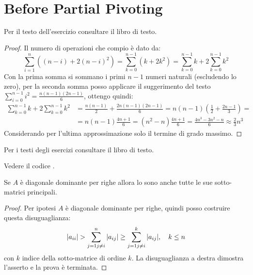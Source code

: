 \section{Before Partial Pivoting}

\begin{exercise}[3.6]
Per il testo dell'esercizio consultare il libro di testo.
\end{exercise}
\begin{proof}
Il numero di operazioni che compio \`e dato da:
\begin{displaymath}
\sum_{i = 1}^{n}{\left( (n-i) + 2(n-i)^{2} \right)} =
\sum_{k = 0}^{n - 1}{\left( k + 2k^{2} \right)} = 
\sum_{k = 0}^{n - 1}{k } + 2\sum_{k = 0}^{n - 1}{k^{2}} 
\end{displaymath}
Con la prima somma si sommano i primi $n-1$ numeri naturali (escludendo lo
zero), per la seconda somma posso applicare il suggerimento del testo 
$\sum_{i = 0}^{n-1}{i^{2}} = \frac{n(n-1)(2n-1)}{6}$, ottengo quindi:
\begin{displaymath}
\begin{split}
\sum_{k = 0}^{n - 1}{k } + 2\sum_{k = 0}^{n - 1}{k^{2}} &= \frac{n(n-1)}{2} +
\frac{2n(n-1)(2n-1)}{6} = n(n-1)\left( \frac{1}{2} + \frac{2n-1}{3}\right ) = \\
&= n(n-1) \frac{4n+1}{6} = (n^{2}-n) \frac{4n+1}{6} = \frac{4n^{3} -3n^{2}-n}{6}
\approx \frac{2}{3}n^{3}
\end{split}
\end{displaymath}
Considerando per l'ultima approssimazione solo il termine di grado massimo.
\end{proof}

\begin{exercise}[3.7, 3.8]
Per i testi degli esercizi consultare il libro di testo.
\end{exercise}
Vedere il codice .

\begin{exercise}[3.9, Lemma 3.4]
Se $A$ \`e diagonale dominante per righe allora lo sono anche tutte le sue
sotto-matrici principali.
\end{exercise}
\begin{proof}
Per ipotesi $A$ \`e diagonale dominante per righe, quindi posso costruire questa 
disuguaglianza:
\begin{displaymath}
|a_{ii}| > \sum_{j = 1 \\j \not = i}^{n}{|a_{ij}|} \geq \sum_{j = 1 \\j \not =
i}^{k}{|a_{ij}|}, \quad k \leq n
\end{displaymath}
con $k$ indice della sotto-matrice di ordine $k$. La disuguaglianza a destra
dimostra l'asserto e la prova \`e terminata.
\end{proof}

